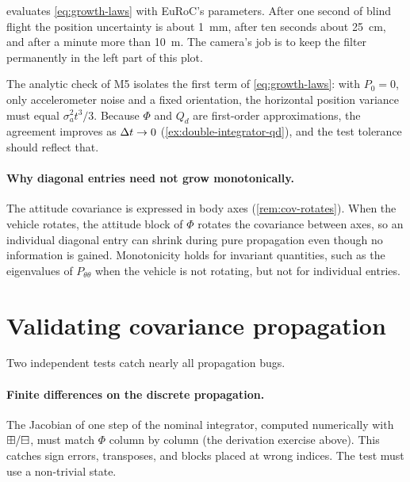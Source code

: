  evaluates \eqref{eq:growth-laws} with EuRoC's parameters. After one second of blind flight the
position uncertainty is about 1~mm, after ten seconds about 25~cm, and after a minute more than 10~m. The
camera's job is to keep the filter permanently in the left part of this plot.

\begin{projectlink}[Milestone 5]
The analytic check of M5 isolates the first term of \eqref{eq:growth-laws}: with $P_0 = 0$, only accelerometer noise and a
fixed orientation, the horizontal position variance must equal $\sigma_a^2t^3/3$. Because $\Phi$ and $Q_d$ are first-order
approximations, the agreement improves as ${\Delta t}\to0$ (\cref{ex:double-integrator-qd}), and the test tolerance should reflect
that.
\end{projectlink}

\paragraph{Why diagonal entries need not grow monotonically.} The attitude covariance is expressed in body axes
(\cref{rem:cov-rotates}). When the vehicle rotates, the attitude block of $\Phi$ rotates the covariance between axes, so an
individual diagonal entry can shrink during pure propagation even though no information is gained. Monotonicity
holds for invariant quantities, such as the eigenvalues of $P_{\theta\theta}$ when the vehicle is not rotating, but not for
individual entries.

\section{Validating covariance propagation}

Two independent tests catch nearly all propagation bugs.

\paragraph{Finite differences on the discrete propagation.} The Jacobian of one step of the nominal integrator,
computed numerically with $\boxplus/\boxminus$, must match $\Phi$ column by column (the derivation exercise above). This
catches sign errors, transposes, and blocks placed at wrong indices. The test must use a non-trivial state.

